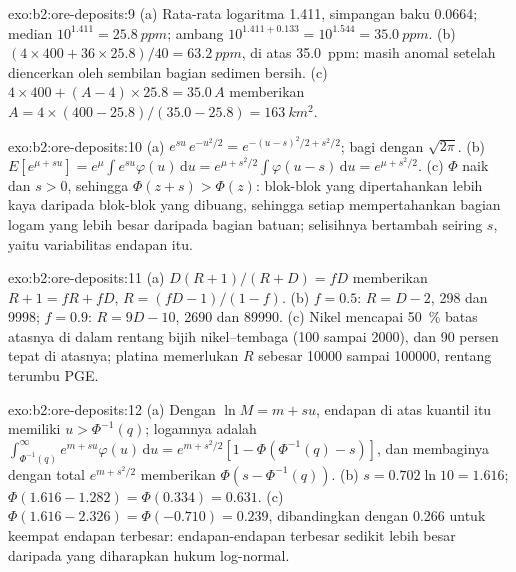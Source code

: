 \begin{solution}{exo:b2:ore-deposits:9}
(a) Rata-rata logaritma 1.411, simpangan baku 0.0664; median $10^{1.411} = \qty{25.8}{ppm}$;
ambang $10^{1.411 + 0.133} = 10^{1.544} = \qty{35.0}{ppm}$. (b) $(4 \times 400 + 36 \times 25.8)/40 =
\qty{63.2}{ppm}$, di atas \qty{35.0}{ppm}: masih anomal setelah diencerkan oleh sembilan bagian sedimen
bersih. (c) $4 \times 400 + (A - 4) \times 25.8 = 35.0\,A$ memberikan $A = 4 \times (400 -
25.8)/(35.0 - 25.8) = \qty{163}{km^2}$.
\end{solution}

\begin{solution}{exo:b2:ore-deposits:10}
(a) $e^{su}\,e^{-u^2/2} = e^{-(u - s)^2/2 + s^2/2}$; bagi dengan $\sqrt{2\pi}$. (b) $E[e^{\mu + su}] =
e^{\mu}\int e^{su}\varphi(u)\,\mathrm{d}u = e^{\mu + s^2/2}\int\varphi(u - s)\,\mathrm{d}u = e^{\mu +
s^2/2}$. (c) $\Phi$ naik dan $s > 0$, sehingga $\Phi(z + s) > \Phi(z)$: blok-blok yang dipertahankan lebih kaya daripada
blok-blok yang dibuang, sehingga setiap  mempertahankan bagian logam yang lebih besar daripada bagian batuan; selisihnya
bertambah seiring $s$, yaitu variabilitas endapan itu.
\end{solution}

\begin{solution}{exo:b2:ore-deposits:11}
(a) $D(R + 1)/(R + D) = fD$ memberikan $R + 1 = fR + fD$, $R = (fD - 1)/(1 - f)$. (b) $f = 0.5$: $R = D - 2$,
298 dan \num{9998}; $f = 0.9$: $R = 9D - 10$, \num{2690} dan \num{89990}. (c) Nikel mencapai
\qty{50}{\percent} batas atasnya di dalam rentang bijih nikel--tembaga (100 sampai \num{2000}), dan 90 persen tepat di atasnya;
platina memerlukan $R$ sebesar \num{10000} sampai \num{100000}, rentang terumbu PGE.
\end{solution}

\begin{solution}{exo:b2:ore-deposits:12}
(a) Dengan $\ln M = m + s u$, endapan di atas kuantil itu memiliki $u > \Phi^{-1}(q)$; logamnya adalah
$\int_{\Phi^{-1}(q)}^{\infty} e^{m + su}\varphi(u)\,\mathrm{d}u = e^{m + s^2/2}[1 - \Phi(\Phi^{-1}(q) -
s)]$, dan membaginya dengan total $e^{m + s^2/2}$ memberikan $\Phi(s - \Phi^{-1}(q))$. (b) $s = 0.702 \ln 10 =
1.616$; $\Phi(1.616 - 1.282) = \Phi(0.334) = 0.631$. (c) $\Phi(1.616 - 2.326) = \Phi(-0.710) = 0.239$,
dibandingkan dengan 0.266 untuk keempat endapan terbesar: endapan-endapan terbesar sedikit lebih besar daripada yang diharapkan hukum
log-normal.
\end{solution}

